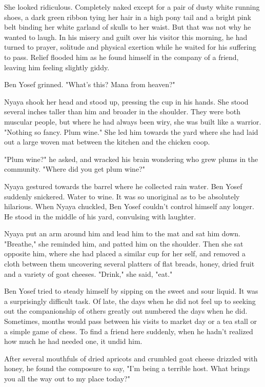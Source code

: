 \documentclass{amsart}
\begin{document}
She looked ridiculous. Completely naked except for a pair of dusty white running shoes, a dark green ribbon tying her hair in a high pony tail and a bright pink belt binding her white garland of skulls to her waist. But that was not why he wanted to laugh. In his misery and guilt over his visitor this morning, he had turned to prayer, solitude and physical exertion while he waited for his suffering to pass. Relief flooded him as he found himself in the company of a friend, leaving him feeling slightly giddy. 

Ben Yosef grinned. "What's this? Mana from heaven?"

Nyaya shook her head and stood up, pressing the cup in his hands. She stood several inches taller than him and broader in the shoulder. They were both muscular people, but where he had always been wiry, she was built like a warrior. "Nothing so fancy. Plum wine." She led him towards the yard where she had laid out a large woven mat between the kitchen and the chicken coop. 

"Plum wine?" he asked, and wracked his brain wondering who grew plums in the community. "Where did you get plum wine?"

Nyaya gestured towards the barrel where he collected rain water. Ben Yosef suddenly snickered. Water to wine. It was so unoriginal as to be absolutely hilarious. When Nyaya chuckled, Ben Yosef couldn't control himself any longer. He stood in the middle of his yard, convulsing with laughter. 

Nyaya put an arm around him and lead him to the mat and sat him down. "Breathe," she reminded him, and patted him on the shoulder. Then she sat opposite him, where she had placed a similar cup for her self, and removed a cloth between them uncovering several platters of flat breads, honey, dried fruit and a variety of goat cheeses. "Drink," she said, "eat."

Ben Yosef tried to steady himself by sipping on the sweet and sour liquid. It was a surprisingly difficult task. Of late, the days when he did not feel up to seeking out the companionship of others greatly out numbered the days when he did. Sometimes, months would pass between his visits to market day or a tea stall or a simple game of chess. To find a friend here suddenly, when he hadn't realized how much he had needed one, it undid him.

After several mouthfuls of dried apricots and crumbled goat cheese drizzled with honey, he found the composure to say, "I'm being a terrible host. What brings you all the way out to my place today?"
\end{document}
